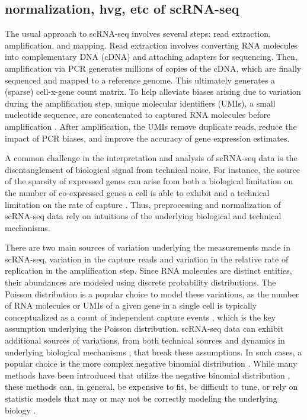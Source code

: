 \subsection{normalization, hvg, etc of scRNA-seq}
The usual approach to scRNA-seq involves several steps: read extraction, amplification, and mapping.
Read extraction involves converting RNA molecules into complementary DNA (cDNA) and attaching adapters for sequencing.
Then, amplification via PCR generates millions of copies of the cDNA, which are finally sequenced and mapped to a reference genome.
This ultimately generates a (sparse) cell-x-gene count matrix.
To help alleviate biases arising due to variation during the amplification step, unique molecular identifiers (UMIs), a small nucleotide sequence, are concatenated to captured RNA molecules before amplification \cite{islam2014}.
After amplification, the UMIs remove duplicate reads, reduce the impact of PCR biases, and improve the accuracy of gene expression estimates.

A common challenge in the interpretation and analysis of scRNA-seq data is the disentanglement of biological signal from technical noise.
For instance, the source of the sparsity of expressed genes can arise from both a biological limitation on the number of co-expressed genes a cell is able to exhibit and a technical limitation on the rate of capture \cite{breda2021}.
Thus, preprocessing and normalization of scRNA-seq data rely on intuitions of the underlying biological and technical mechanisms.

There are two main sources of variation underlying the measurements made in scRNA-seq,
variation in the capture reads and variation in the relative rate of replication in the amplification step.
Since RNA molecules are distinct entities, their abundances are modeled using discrete probability distributions.
The Poisson distribution is a popular choice to model these variations,
as the number of RNA molecules or UMIs of a given gene in a single cell is typically conceptualized as a count of independent capture events \cite{breda2021},
which is the key assumption underlying the Poisson distribution.
scRNA-seq data can exhibit additional sources of variations, from both technical sources and dynamics in underlying biological mechanisms \cite{hicks2018},
that break these assumptions.
In such cases, a popular choice is the more complex negative binomial distribution \cite{choudhary2022}.
While many methods have been introduced that utilize the negative binomial distribution \cite{lopez2018, risso2018, eraslan2019},
these methods can, in general, be expensive to fit, be difficult to tune, or rely on statistic models that may or may not be correctly modeling the underlying biology \cite{ahlmann-eltze2023}.

